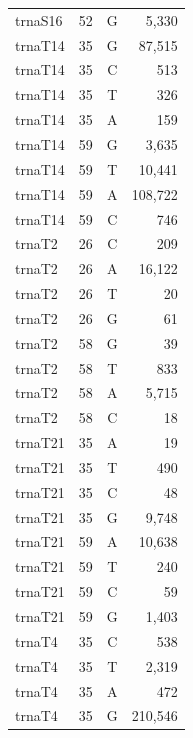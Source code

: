\documentclass[12pt]{rockefeller}
\begin{document}
\begin{tiny}
\begin{longtable}{|l|r|c|r|}
 trnaS16 &        52 &          G &      5,330 \\
 trnaT14 &        35 &          G &     87,515 \\
 trnaT14 &        35 &          C &        513 \\
 trnaT14 &        35 &          T &        326 \\
 trnaT14 &        35 &          A &        159 \\
 trnaT14 &        59 &          G &      3,635 \\
 trnaT14 &        59 &          T &     10,441 \\
 trnaT14 &        59 &          A &    108,722 \\
 trnaT14 &        59 &          C &        746 \\
  trnaT2 &        26 &          C &        209 \\
  trnaT2 &        26 &          A &     16,122 \\
  trnaT2 &        26 &          T &         20 \\
  trnaT2 &        26 &          G &         61 \\
  trnaT2 &        58 &          G &         39 \\
  trnaT2 &        58 &          T &        833 \\
  trnaT2 &        58 &          A &      5,715 \\
  trnaT2 &        58 &          C &         18 \\
 trnaT21 &        35 &          A &         19 \\
 trnaT21 &        35 &          T &        490 \\
 trnaT21 &        35 &          C &         48 \\
 trnaT21 &        35 &          G &      9,748 \\
 trnaT21 &        59 &          A &     10,638 \\
 trnaT21 &        59 &          T &        240 \\
 trnaT21 &        59 &          C &         59 \\
 trnaT21 &        59 &          G &      1,403 \\
  trnaT4 &        35 &          C &        538 \\
  trnaT4 &        35 &          T &      2,319 \\
  trnaT4 &        35 &          A &        472 \\
  trnaT4 &        35 &          G &    210,546 \\

\end{longtable}
\end{tiny}
\end{document}
